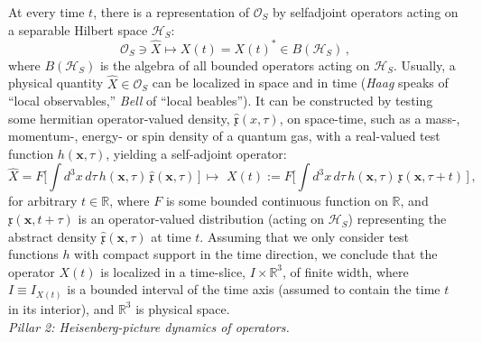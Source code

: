 \documentclass[12pt]{article}
\begin{document}
At every time $t$, there is a representation of 
$\mathcal{O}_S$ by selfadjoint operators acting on a separable Hilbert space $\mathcal{H}_S$:
\begin{equation}\label{Rep}
\mathcal{O}_S \ni \hat{X} \mapsto X(t)= X(t)^{*} \in B(\mathcal{H}_S)\,,
\end{equation}
where $B(\mathcal{H}_S)$ is the algebra of all bounded operators acting on $\mathcal{H}_S$. Usually, 
a physical quantity $\hat{X}\in \mathcal{O}_S$ can be localized in space and in time (\textit{Haag} \cite{Haag} speaks of ``local observables,'' \textit{Bell} \cite{Bell} of ``local beables''). It can be constructed by testing some hermitian operator-valued 
density, $\hat{\mathfrak{x}}(x,\tau)$, on space-time, such as a mass-, momentum-, energy- or spin density of a quantum gas, 
with a real-valued test function $h(\mathbf{x},\tau)$, yielding a self-adjoint operator:
\begin{equation}\label{phys quantity}
\hat{X}=F\Big[\int d^{3}x\, d\tau\, h(\mathbf{x},\tau)\, \hat{\mathfrak{x}}(\mathbf{x},\tau)\,\Big]\, \mapsto \,\,
X(t) := F\Big[ \int d^{3}x \, d\tau \,h(\mathbf{x},\tau)\, \mathfrak{x}(\mathbf{x}, \tau+ t)\,\Big]\,,
\end{equation}
for arbitrary $t\in \mathbb{R}$, where $F$ is some bounded continuous function on $\mathbb{R}$, and $\mathfrak{x}(\mathbf{x},t+\tau)$ 
is an operator-valued distribution (acting on $\mathcal{H}_S$) 
representing the abstract density $\hat{\mathfrak{x}}(\mathbf{x}, \tau)$ at time $t$.
Assuming that we only consider test functions $h$ with compact support in the time direction, we conclude that the operator 
$X(t)$ is localized in a time-slice, $I\times \mathbb{R}^{3}$, of finite width, where $I\equiv I_{X(t)}$ is a bounded interval of the 
time axis (assumed to contain the time $t$ in its interior), and $\mathbb{R}^{3}$ is physical space.\\

\textit{{Pillar 2}: Heisenberg-picture dynamics of operators.}
\end{document}
